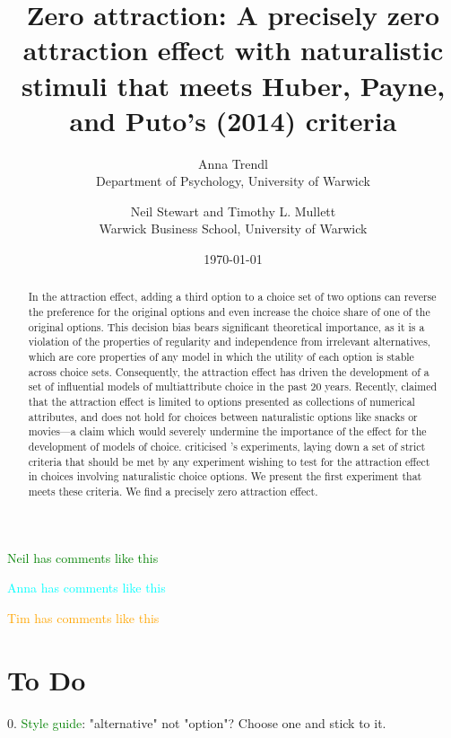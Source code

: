 \documentclass[12pt, a4paper]{article}
\title{}
\author{}
\date{}
\title{Zero attraction: A precisely zero attraction effect with naturalistic stimuli that meets Huber, Payne, and Puto's (2014) criteria}
\author{Anna Trendl\\Department of Psychology, University of Warwick \and Neil Stewart and Timothy L. Mullett\\Warwick Business School, University of Warwick}
\date{\today}
\newcommand{\NS}[1] {{\textcolor{green}{#1}}}
\newcommand{\AT}[1] {{\textcolor{cyan}{#1}}}
\newcommand{\TM}[1] {{\textcolor{orange}{#1}}}
\begin{document}
\begin{titlepage}
\maketitle

\newpage

\begin{abstract}
In the attraction effect, adding a third option to a choice set of two options can reverse the preference for the original options and even increase the choice share of one of the original options. This decision bias bears significant theoretical importance, as it is a violation of the properties of regularity and independence from irrelevant alternatives, which are core properties of any model in which the utility of each option is stable across choice sets. Consequently, the attraction effect has driven the development of a set of influential models of multiattribute choice in the past 20 years. Recently,  claimed that the attraction effect is limited to options presented as collections of numerical attributes, and does not hold for choices between naturalistic options like snacks or movies---a claim which would severely undermine the importance of the effect for the development of models of choice.  criticised \citeauthor{Frederick2014}'s experiments, laying down a set of strict criteria that should be met by any experiment wishing to test for the attraction effect in choices involving naturalistic choice options. We present the first experiment that meets these criteria. We find a precisely zero attraction effect.
\end{abstract}
\end{titlepage}

\NS{Neil has comments like this}

\AT{Anna has comments like this}

\TM{Tim has comments like this}


\section{To Do}

0. \NS{Style guide}: "alternative" not "option"? Choose one and stick to it.
\end{document}
